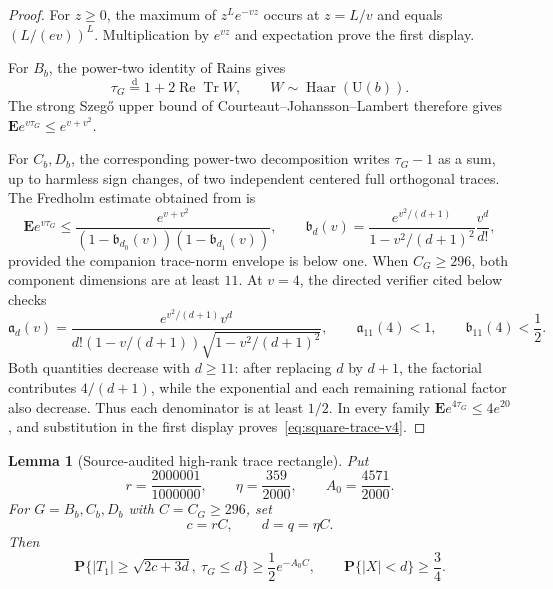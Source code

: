 \documentclass[11pt,reqno]{amsart}
\theoremstyle{plain}
\newtheorem{lemma}[theorem]{Lemma}
\theoremstyle{definition}
\DeclareMathOperator{\Haar}{Haar}
\begin{document}
\begin{proof}
For $z\geq0$, the maximum of $z^Le^{-vz}$ occurs at $z=L/v$ and equals
$(L/(ev))^L$.  Multiplication by $e^{vz}$ and expectation prove the first
display.

For $B_b$, the power-two identity of Rains
\cite[Theorem~1.5, equation~(23)]{RainsPowerMaps} gives
\[
 \tau_G\mathrel{\mathop=\limits^{\mathrm d}}
 1+2\operatorname{Re}\operatorname{Tr}W,
 \qquad W\sim\Haar(\mathrm U(b)).
\]
The strong Szeg\H{o} upper bound of
Courteaut--Johansson--Lambert
\cite[Lemma~2.12]{CJL2022} therefore gives
$\mathbf E e^{v\tau_G}\leq e^{v+v^2}$.

For $C_b,D_b$, the corresponding power-two decomposition
\cite[Theorem~1.5, equation~(22), and equation~(36)]{RainsPowerMaps}
writes $\tau_G-1$ as a sum, up to harmless sign changes, of two independent
centered full orthogonal traces.  The Fredholm estimate obtained from
\cite[Proposition~3.3 and equations~(3.4)--(3.6)]{CJL2022} is
\[
 \mathbf E e^{v\tau_G}
 \leq
 \frac{e^{v+v^2}}
 {(1-\mathfrak b_{d_0}(v))(1-\mathfrak b_{d_1}(v))},
 \qquad
 \mathfrak b_d(v)=
 \frac{e^{v^2/(d+1)}}{1-v^2/(d+1)^2}\frac{v^d}{d!},
\]
provided the companion trace-norm envelope is below one.  When
$C_G\geq296$, both component dimensions are at least $11$.  At $v=4$,
the directed verifier cited below checks
\[
 \mathfrak a_d(v)=
 \frac{e^{v^2/(d+1)}v^d}
 {d!(1-v/(d+1))\sqrt{1-v^2/(d+1)^2}},
 \qquad
 \mathfrak a_{11}(4)<1,
 \qquad \mathfrak b_{11}(4)<\frac12.
\]
Both quantities decrease with $d\geq11$: after replacing $d$ by $d+1$,
the factorial contributes $4/(d+1)$, while the exponential and each
remaining rational factor also decrease.  Thus each denominator is at
least $1/2$.  In every family
$\mathbf E e^{4\tau_G}\leq4e^{20}$, and substitution in the first display
proves~\eqref{eq:square-trace-v4}.
\end{proof}

\begin{lemma}[Source-audited high-rank trace rectangle]
\label{lem:full-q3-high-rank-trace-rectangle}
Put
\[
 r=\frac{2000001}{1000000},\qquad
 \eta=\frac{359}{2000},\qquad
 A_0=\frac{4571}{2000}.
\]
For $G=B_b,C_b,D_b$ with $C=C_G\geq296$, set
\[
 c=rC,\qquad d=q=\eta C.
\]
Then
\[
 \mathbf P\{|T_1|\geq\sqrt{2c+3d},\ \tau_G\leq d\}
 \geq\frac12e^{-A_0C},
 \qquad
 \mathbf P\{|X|<d\}\geq\frac34.
\]
\end{lemma}
\end{document}
